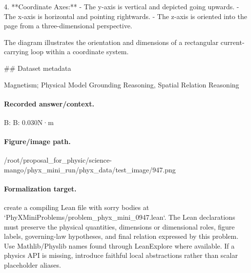 4. **Coordinate Axes:**
   - The y-axis is vertical and depicted going upwards.
   - The x-axis is horizontal and pointing rightwards.
   - The z-axis is oriented into the page from a three-dimensional perspective.

The diagram illustrates the orientation and dimensions of a rectangular current-carrying loop within a coordinate system.

\#\# Dataset metadata

Magnetism; Physical Model Grounding Reasoning, Spatial Relation Reasoning

\paragraph{Recorded answer/context.}
B: B: 0.030N·m

\paragraph{Figure/image path.}
/root/proposal\_for\_physic/science-mango/phyx\_mini\_run/phyx\_data/test\_image/947.png

\paragraph{Formalization target.}
create a compiling Lean file with sorry bodies at `PhyXMiniProblems/problem\_phyx\_mini\_0947.lean`. The Lean declarations must preserve the physical quantities, dimensions or dimensional roles, figure labels, governing-law hypotheses, and final relation expressed by this problem.
Use Mathlib/Physlib names found through LeanExplore where available. If a physics API is missing, introduce faithful local abstractions rather than scalar placeholder aliases.

